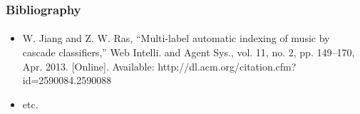 \documentclass{beamer}
\begin{document}
\begin{frame}[noframenumbering]
    \frametitle{Bibliography}
    \framesubtitle{}
    \begin{itemize}
      \item W. Jiang and Z. W. Ras, “Multi-label automatic indexing of music by cascade classifiers,” Web Intelli. and Agent Sys., vol. 11, no. 2, pp. 149–170, Apr. 2013. [Online]. Available: http://dl.acm.org/citation.cfm?id=2590084.2590088
      \item etc.
    \end{itemize}
\end{frame}








%
%
%
%
\end{document}
